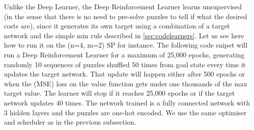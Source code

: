 Unlike the Deep Learner, the Deep Reinforcement Learner learns unsupervised (in the sense that there is no need to pre-solve puzzles to tell if what the desired costs are), since it generates its own target using a combination of a target network and the simple min rule described in \ref{sec:codelearners}. Let us see here how to run it on the (n=4, m=2) SP for instance. The following code snipet will run a Deep Reinforcement Learner for a maximum of 25,000 epochs, generating randomly 10 sequences of puzzles shuffled 50 times from goal state every time it updates the target network. That update will happen either after 500 epochs or when the (MSE) loss on the value function gets under one thousands of the max target value. The learner will stop if it reaches 25,000 epochs or if the target network updates 40 times. The network trained is a fully connected network with 3 hidden layers and the puzzles are one-hot encoded. We use the same optimiser and scheduler as in the previous subsection.

\afblue
